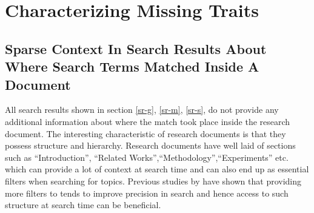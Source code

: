 \pagebreak
\section{Characterizing Missing Traits}
\label{section:intro:missing_traits}

\subsection{Sparse Context In Search Results About Where Search Terms Matched Inside A Document}

All search results shown in section \ref{sr-g}, \ref{sr-m}, \ref{sr-s}, do not provide any additional 
information about where the match took place inside the research document. The interesting characteristic of research documents is that they 
possess structure and hierarchy. Research documents have well laid of sections such as “Introduction”, “Related Works”,“Methodology”,“Experiments” etc. 
which can provide a lot of context at search time and can also end up as essential filters when searching for topics. 
Previous studies by \parencite{kacem2018analysis} have shown that providing more filters to tends to improve 
precision in search and hence access to such structure at search time can be beneficial. 
\pagebreak
